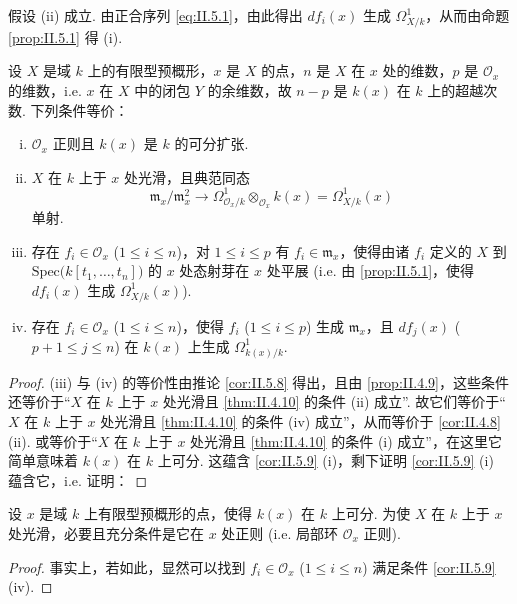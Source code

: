 假设 (ii) 成立. 由正合序列 \eqref{eq:II.5.1}，由此得出 $df_i(x)$ 生成 $\varOmega_{X/k}^{1}$，从而由命题 \ref{prop:II.5.1} 得 (i).

\begin{corollary}\label{cor:II.5.9}
设 $X$ 是域 $k$ 上的有限型预概形，$x$ 是 $X$ 的点，$n$ 是 $X$ 在 $x$ 处的维数，$p$ 是 $\mathcal{O}_x$ 的维数，i.e. $x$ 在 $X$ 中的闭包 $Y$ 的余维数，故 $n - p$ 是 $k(x)$ 在 $k$ 上的超越次数. 下列条件等价：
\begin{enumerate}[(i)]
\item $\mathcal{O}_x$ 正则且 $k(x)$ 是 $k$ 的可分扩张.
\item $X$ 在 $k$ 上于 $x$ 处光滑，且典范同态
\[
\mathfrak{m}_x/\mathfrak{m}_x^2 \longrightarrow \varOmega_{\mathcal{O}_x/k}^{1} \otimes_{\mathcal{O}_x} k(x) = \varOmega_{X/k}^{1}(x)
\]
单射.
\item 存在 $f_i \in \mathcal{O}_x$ ($1 \leqslant i \leqslant n$)，对 $1 \leqslant i \leqslant p$ 有 $f_i \in \mathfrak{m}_x$，使得由诸 $f_i$ 定义的 $X$ 到 $\mathrm{Spec}\bigl(k[t_1, \dots, t_n]\bigr)$ 的 $x$ 处态射芽在 $x$ 处平展 (i.e. 由 \ref{prop:II.5.1}，使得 $df_i(x)$ 生成 $\varOmega_{X/k}^{1}(x)$).
\item 存在 $f_i \in \mathcal{O}_x$ ($1 \leqslant i \leqslant n$)，使得 $f_i$ ($1 \leqslant i \leqslant p$) 生成 $\mathfrak{m}_x$，且 $df_j(x)$ ($p+1 \leqslant j \leqslant n$) 在 $k(x)$ 上生成 $\varOmega_{k(x)/k}^{1}$.
\end{enumerate}
\end{corollary}

\begin{proof}
(iii) 与 (iv) 的等价性由推论 \ref{cor:II.5.8} 得出，且由 \ref{prop:II.4.9}，这些条件还等价于``$X$ 在 $k$ 上于 $x$ 处光滑且 \ref{thm:II.4.10} 的条件 (ii) 成立''. 故它们等价于``$X$ 在 $k$ 上于 $x$ 处光滑且 \ref{thm:II.4.10} 的条件 (iv) 成立''，从而等价于 \ref{cor:II.4.8} (ii). 或等价于``$X$ 在 $k$ 上于 $x$ 处光滑且 \ref{thm:II.4.10} 的条件 (i) 成立''，在这里它简单意味着 $k(x)$ 在 $k$ 上可分. 这蕴含 \ref{cor:II.5.9} (i)，剩下证明 \ref{cor:II.5.9} (i) 蕴含它，i.e. 证明：
\end{proof}

\begin{corollary}\label{cor:II.5.10}
设 $x$ 是域 $k$ 上有限型预概形的点，使得 $k(x)$ 在 $k$ 上可分. 为使 $X$ 在 $k$ 上于 $x$ 处光滑，必要且充分条件是它在 $x$ 处正则 (i.e. 局部环 $\mathcal{O}_x$ 正则).
\end{corollary}

\begin{proof}
事实上，若如此，显然可以找到 $f_i \in \mathcal{O}_x$ ($1 \leqslant i \leqslant n$) 满足条件 \ref{cor:II.5.9} (iv).
\end{proof}

